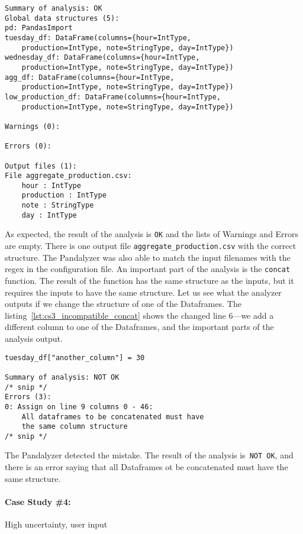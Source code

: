 \begin{lstlisting}[caption=Analysis output of the third case study, label={lst:cs3_analysis_output}, captionpos=b]
Summary of analysis: OK
Global data structures (5):
pd: PandasImport
tuesday_df: DataFrame(columns={hour=IntType,
    production=IntType, note=StringType, day=IntType})
wednesday_df: DataFrame(columns={hour=IntType,
    production=IntType, note=StringType, day=IntType})
agg_df: DataFrame(columns={hour=IntType,
    production=IntType, note=StringType, day=IntType})
low_production_df: DataFrame(columns={hour=IntType,
    production=IntType, note=StringType, day=IntType})

Warnings (0):

Errors (0):

Output files (1):
File aggregate_production.csv:
    hour : IntType
    production : IntType
    note : StringType
    day : IntType
\end{lstlisting}

As expected, the result of the analysis is \verb|OK| and the lists of Warnings and Errors are empty.
There is one output file \verb|aggregate_production.csv| with the correct structure.
The Pandalyzer was also able to match the input filenames with the regex in the configuration file.
An important part of the analysis is the \verb|concat| function.
The result of the function has the same structure as the inputs, but it requires the inputs to have the same structure.
Let us see what the analyzer outputs if we change the structure of one of the Dataframes.
The listing~\ref{lst:cs3_incompatible_concat} shows the changed line 6---we add a different column to one of the
Dataframes, and the important parts of the analysis output.

\begin{lstlisting}[caption=Incompatible Dataframes to concat operation and analysis output, label={lst:cs3_incompatible_concat}, captionpos=b]
tuesday_df["another_column"] = 30

Summary of analysis: NOT OK
/* snip */
Errors (3):
0: Assign on line 9 columns 0 - 46:
    All dataframes to be concatenated must have
    the same column structure
/* snip */
\end{lstlisting}

The Pandalyzer detected the mistake.
The result of the analysis is~\verb|NOT OK|, and there is an error saying that all Dataframes ot be concatenated must
have the same structure.


\paragraph{Case Study \#4:} High uncertainty, user input \\

